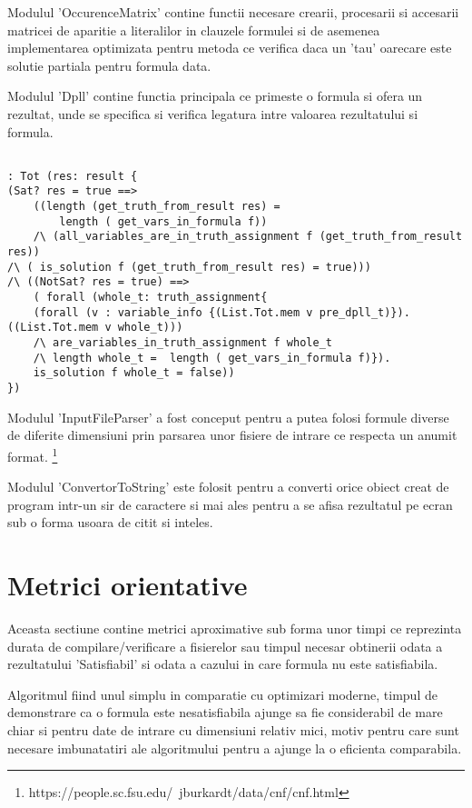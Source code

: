 Modulul 'OccurenceMatrix' contine functii necesare crearii, procesarii si accesarii matricei de aparitie a literalilor in clauzele formulei si de asemenea implementarea optimizata pentru metoda ce verifica daca un 'tau' oarecare este solutie partiala pentru formula data.

Modulul 'Dpll' contine functia principala ce primeste o formula si ofera un \newline rezultat, unde se specifica si verifica legatura intre valoarea rezultatului si formula.

\begin{lstlisting}[]

: Tot (res: result {
(Sat? res = true ==> 
	((length (get_truth_from_result res) = 
		length ( get_vars_in_formula f)) 
	/\ (all_variables_are_in_truth_assignment f (get_truth_from_result res)) 
/\ ( is_solution f (get_truth_from_result res) = true)))
/\ ((NotSat? res = true) ==> 
	( forall (whole_t: truth_assignment{ 
	(forall (v : variable_info {(List.Tot.mem v pre_dpll_t)}). ((List.Tot.mem v whole_t)))
	/\ are_variables_in_truth_assignment f whole_t 
	/\ length whole_t =  length ( get_vars_in_formula f)}). 
	is_solution f whole_t = false))
})  

\end{lstlisting}

Modulul 'InputFileParser' a fost conceput pentru a putea folosi formule diverse de diferite dimensiuni prin parsarea unor fisiere de intrare ce respecta un anumit format. \footnote{https://people.sc.fsu.edu/~jburkardt/data/cnf/cnf.html}

 Modulul 'ConvertorToString' este folosit pentru a converti orice obiect creat de program intr-un sir de caractere si mai ales pentru a se afisa rezultatul pe ecran sub o forma usoara de citit si inteles.


\section{Metrici orientative}

Aceasta sectiune contine metrici aproximative sub forma unor timpi ce reprezinta durata de compilare/verificare a fisierelor sau timpul necesar obtinerii odata a rezultatului 'Satisfiabil' si odata a cazului in care formula nu este satisfiabila.


Algoritmul fiind unul simplu in comparatie cu optimizari moderne, timpul de demonstrare ca o formula este nesatisfiabila ajunge sa fie considerabil de mare chiar si pentru date de intrare cu dimensiuni relativ mici, motiv pentru care sunt necesare imbunatatiri ale algoritmului pentru a ajunge la o eficienta comparabila.

